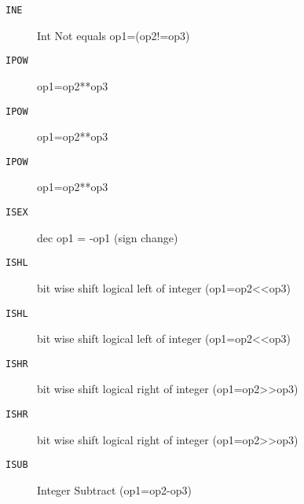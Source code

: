 \begin{description}
\item[\texttt{INE}]  Int Not equals op1=(op2!=op3)\\

\end{description}
\begin{description}
\item[\texttt{IPOW}]  op1=op2**op3\\

\end{description}
\begin{description}
\item[\texttt{IPOW}]  op1=op2**op3\\

\end{description}
\begin{description}
\item[\texttt{IPOW}]  op1=op2**op3\\

\end{description}
\begin{description}
\item[\texttt{ISEX}]  dec op1 = -op1 (sign change)\\

\end{description}
\begin{description}
\item[\texttt{ISHL}]  bit wise shift logical left of integer (op1=op2<<op3)\\

\end{description}
\begin{description}
\item[\texttt{ISHL}]  bit wise shift logical left of integer (op1=op2<<op3)\\

\end{description}
\begin{description}
\item[\texttt{ISHR}]  bit wise shift logical right of integer (op1=op2>>op3)\\

\end{description}
\begin{description}
\item[\texttt{ISHR}]  bit wise shift logical right of integer (op1=op2>>op3)\\

\end{description}
\begin{description}
\item[\texttt{ISUB}]  Integer Subtract (op1=op2-op3)\\

\end{description}
